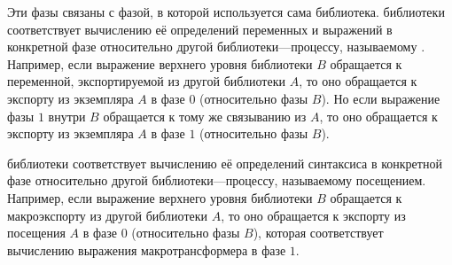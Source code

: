 Эти фазы связаны с фазой, в которой используется сама библиотека. 
библиотеки соответствует вычислению её определений переменных и выражений в конкретной фазе
относительно другой библиотеки---процессу, называемому . Например,
если выражение верхнего уровня библиотеки $B$ обращается к переменной, экспортируемой из
другой библиотеки $A$, то оно обращается к экспорту из экземпляра $A$ в фазе $0$ (относительно
фазы $B$). Но если выражение фазы $1$ внутри $B$ обращается к тому же связыванию из
$A$, то оно обращается к экспорту из экземпляра $A$ в фазе $1$ (относительно фазы $B$).

 библиотеки соответствует вычислению её определений синтаксиса
в конкретной фазе относительно другой библиотеки---процессу, называемому 
{посещением}. Например, если выражение верхнего уровня библиотеки $B$ обращается к
макроэкспорту из другой библиотеки $A$, то оно обращается к экспорту из посещения
$A$ в фазе $0$ (относительно фазы $B$), которая соответствует вычислению выражения
макротрансформера в фазе $1$.

